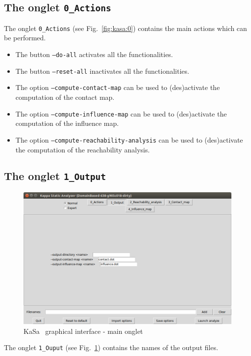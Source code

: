 \documentclass[11pt]{book}
\def\KaSa{\textsf{KaSa}}
\begin{document}
\subsection{The onglet \texttt{0\_Actions}}

The onglet \texttt{0\_Actions} (see Fig.~\ref{fig:kasa:0}) contains the main actions which can be performed. 

\begin{itemize}
\item The button \texttt{--do-all} activates all the functionalities. 
\item The button \texttt{--reset-all} inactivates all the functionalities.
\item The option \texttt{--compute-contact-map} can be used to (des)activate the computation of the contact map. 
\item The option \texttt{--compute-influence-map} can be used to (des)activate the computation of the influence map.
\item The option \texttt{--compute-reachability-analysis} can be used to (des)activate the computation of the reachability analysis.
\end{itemize}

\subsection{The onglet \texttt{1\_Output}}

\begin{figure}[htbp]
\centering
\includegraphics[width=12cm,natwidth=920pt,natheight=582pt]{img/kasa_1.png}
\caption{\KaSa~ graphical interface - main onglet}
\label{fig:kasa:1}
\end{figure}


The onglet \texttt{1\_Ouput} (see Fig.~\ref{fig:kasa:1}) contains the names of the output files. 
\end{document}
